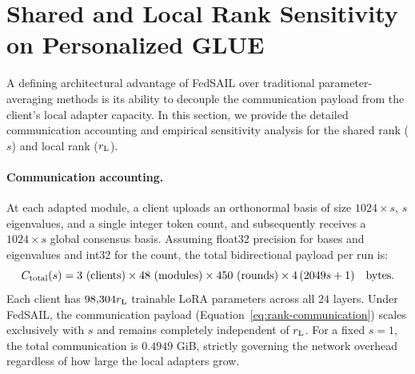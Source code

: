 \documentclass[11pt,letterpaper]{article}
\begin{document}
\FloatBarrier

\section{Shared and Local Rank Sensitivity on Personalized GLUE}
\label{app:rank-sensitivity}

A defining architectural advantage of FedSAIL over traditional parameter-averaging methods is its ability to decouple the communication payload from the client's local adapter capacity. In this section, we provide the detailed communication accounting and empirical sensitivity analysis for the shared rank ($s$) and local rank ($r_{\rm L}$).

\paragraph{Communication accounting.}
At each adapted module, a client uploads an orthonormal basis of size $1024 \times s$, $s$ eigenvalues, and a single integer token count, and subsequently receives a $1024 \times s$ global consensus basis. Assuming float32 precision for bases and eigenvalues and int32 for the count, the total bidirectional payload per run is:
\begin{equation}
    C_{\rm total}(s)
    = 3 \text{ (clients)} \times 48 \text{ (modules)} \times 450 \text{ (rounds)} \times 4\,(2049s+1)\quad\text{bytes}.
    \label{eq:rank-communication}
\end{equation}
Each client has $98{,}304r_{\rm L}$ trainable LoRA parameters across all $24$ layers. Under FedSAIL, the communication payload (Equation~\ref{eq:rank-communication}) scales exclusively with $s$ and remains completely independent of $r_{\rm L}$. For a fixed $s=1$, the total communication is $0.4949$ GiB, strictly governing the network overhead regardless of how large the local adapters grow.
\end{document}
